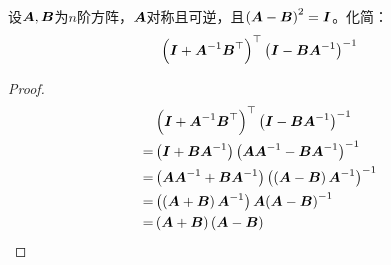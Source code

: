 \begin{suplprob}\label{supl-1.2}
    设\(\mata,\matb\)为\(n\)阶方阵，\(\mata\)对称且可逆，且\(\mypar{\mata-\matb}^2=\mati\)。化简：
    \begin{equation*}
        \mypar{\mati+\inv{\mata}\matb^\top}^\top\inv{\mypar{\mati-\matb\inv{\mata}}}
    \end{equation*}
\end{suplprob}
\begin{proof}
    \begin{align*}
          & \mypar{\mati+\inv{\mata}\matb^\top}^\top\inv{\mypar{\mati-\matb\inv{\mata}}}          \\
        = & \mypar{\mati+\matb\inv{\mata}}\inv{\mypar{\mata\inv{\mata}-\matb\inv{\mata}}}         \\
        = & \mypar{\mata\inv{\mata}+\matb\inv{\mata}}\inv{\mypar{\mypar{\mata-\matb}\inv{\mata}}} \\
        = & \mypar{\mypar{\mata+\matb}\inv{\mata}}\mata\pinv{\mata-\matb}                         \\
        = & \mypar{\mata+\matb}\mypar{\mata-\matb}
    \end{align*}
\end{proof}